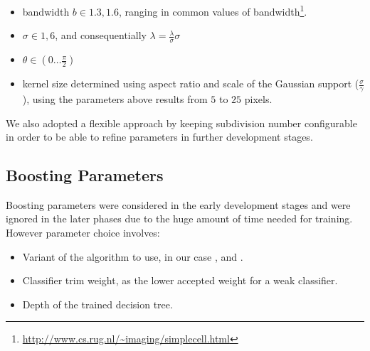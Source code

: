 \begin{itemize}
  \item bandwidth $b \in 1.3,1.6$, %
    ranging in common values of bandwidth\cite{gaborBandwidth}\footnote{\url{http://www.cs.rug.nl/~imaging/simplecell.html}}.
  \item $\sigma \in 1,6$, and consequentially $\lambda = \frac{\lambda}{\sigma} \sigma $
  \item $\theta \in ( 0 \ldots \frac{\pi}{2} )$
  \item kernel size determined using aspect ratio and scale of the Gaussian support ($\frac{\sigma}{\gamma}$), using the parameters above results from $5$ to $25$ pixels.
\end{itemize}

We also adopted a flexible approach by keeping subdivision number configurable in order to be able to refine parameters in further development stages.

\subsection{Boosting Parameters}

Boosting parameters were considered in the early development stages and were ignored in the later phases due to the huge amount of time needed for  training. However parameter choice involves:

\begin{itemize}
\item Variant of the algorithm to use, in our case ,  and .
\item Classifier trim weight, as the lower accepted weight for a weak classifier.
\item Depth of the trained decision tree.
\end{itemize}

